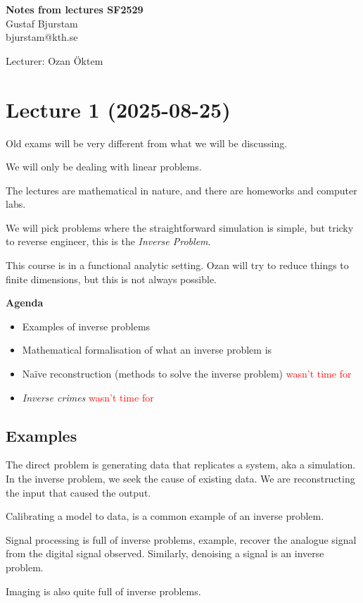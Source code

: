 \documentclass[12pt]{article}
\begin{document}
\begin{center}
\textbf{\large Notes from lectures SF2529} \\
Gustaf Bjurstam\\
bjurstam@kth.se\\
\end{center}
Lecturer: Ozan Öktem
\section{Lecture 1 (2025-08-25)}
Old exams will be very different from what we will be discussing.

We will only be dealing with linear problems.

The lectures are mathematical in nature, and there are homeworks and computer labs.

We will pick problems where the straightforward simulation is simple, but tricky to reverse engineer, this is the \textit{Inverse Problem}.

This course is in a functional analytic setting. Ozan will try to reduce things to finite dimensions, but this is not always possible.

\textbf{Agenda}
\begin{itemize}
    \item Examples of inverse problems
    \item Mathematical formalisation of what an inverse problem is
    \item Naïve reconstruction (methods to solve the inverse problem) \textcolor{red}{wasn't time for}
    \item \textit{Inverse crimes} \textcolor{red}{wasn't time for}
\end{itemize}

\subsection{Examples}
The direct problem is generating data that replicates a system, aka a simulation. In the inverse problem, we seek the cause of existing data. We are reconstructing the input that caused the output.

Calibrating a model to data, is a common example of an inverse problem.

Signal processing is full of inverse problems, example, recover the analogue signal from the digital signal observed. Similarly, denoising a signal is an inverse problem.

Imaging is also quite full of inverse problems.
\end{document}
